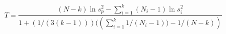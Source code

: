 

\[
T = \frac{(N-k) \ln{s^{2}_{p}} - \sum_{i=1}^{k}(N_{i} - 1)\ln{s^{2}_{i}}}{1 + (1/(3(k-1)))((\sum_{i=1}^{k}{1/(N_{i} - 1))} - 1/(N-k))}
\]



